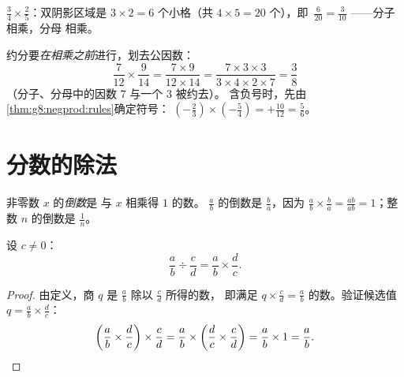 \begin{omfigure}

{\small $\frac34 \times \frac25$：双阴影区域是
$3 \times 2 = 6$ 个小格（共 $4 \times 5 = 20$ 个），即\
$\frac{6}{20} = \frac{3}{10}$ ——分子相乘，分母
相乘。}
\end{omfigure}

\begin{example}\label{ex:g8:fractions:mult}
约分要\emph{在相乘之前}进行，划去公因数：
\[
\frac{7}{12} \times \frac{9}{14}
= \frac{7 \times 9}{12 \times 14}
= \frac{7 \times 3 \times 3}{3 \times 4 \times 2 \times 7}
= \frac{3}{8}
\]
（分子、分母中的因数 $7$ 与一个 $3$ 被约去）。
含负号时，先由\cref{thm:g8:negprod:rules}确定符号：
$\left(-\frac23\right) \times \left(-\frac{5}{4}\right) =
+\frac{10}{12} = \frac56$。
\end{example}

\section{分数的除法}

\begin{definition}[倒数]\label{def:g8:fractions:inverse}
非零数 $x$ 的\emph{倒数}是
与 $x$ 相乘得 $1$ 的数。
$\frac ab$ 的倒数是 $\frac ba$，因为
$\frac ab \times \frac ba = \frac{ab}{ab} = 1$；整数 $n$ 的倒数是
$\frac1n$。
\end{definition}

\begin{theorem}[除法即乘以倒数]\label{thm:g8:fractions:div}
设 $c \neq 0$：
\[
\frac{a}{b} \div \frac{c}{d} = \frac{a}{b} \times \frac{d}{c} .
\]
\end{theorem}

\begin{proof}
由定义，商 $q$ 是 $\frac ab$ 除以 $\frac cd$ 所得的数，
即满足 $q \times \frac cd = \frac ab$ 的数。验证候选值
$q = \frac ab \times \frac dc$：
\[
\left(\frac ab \times \frac dc\right) \times \frac cd
= \frac ab \times \left(\frac dc \times \frac cd\right)
= \frac ab \times 1 = \frac ab . \qedhere
\]
\end{proof}

